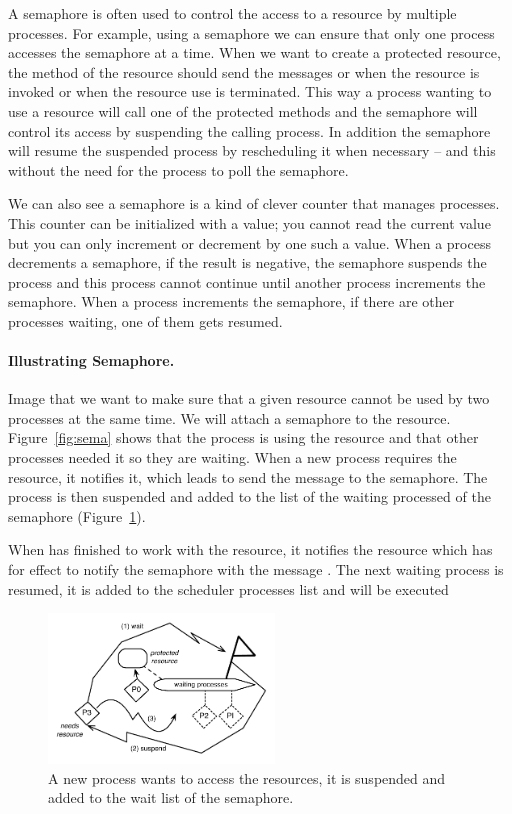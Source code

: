 \documentclass[a4paper,10pt,twoside]{book}
\begin{document}
A semaphore is often used to control the access  to a resource by multiple processes. For example, using a semaphore we can ensure that only one process accesses the semaphore at a time. 
When we want to create a protected resource, the method of the resource should send the messages  or  when the resource is invoked or  when the resource use is terminated. 
This way a process wanting to use a resource will call one of the protected methods and the semaphore
will control its access by suspending the calling process. In addition the semaphore will resume the suspended 
process by rescheduling it when necessary -- and this without the need for the process to poll the semaphore.


We can also see a semaphore is a kind of clever counter that manages processes. 
This counter can be initialized with a value;  you cannot read the current value but you can only increment or decrement by one such a value. When a process decrements a semaphore, if the result is negative, the 
semaphore suspends the process and this process cannot continue until another process increments 
the semaphore. When a process increments the semaphore, if there are other processes waiting, one of them gets resumed.



\paragraph{Illustrating Semaphore.}
Image that we want to make sure that a given resource cannot be used by two processes at the same time.
We will attach a semaphore to the resource. Figure~\ref{fig:sema} shows that the process  is using the resource and that other processes needed it so they are waiting. When a new process  requires the resource, it notifies it, which leads to send the message  to the semaphore. The process is then suspended and added to the list of the waiting processed of the semaphore (Figure~\ref{fig:SemaphoreSendingWait}). 


When  has finished to work with the resource, it notifies the resource which has for effect to notify the semaphore with the message . The next waiting process is resumed, it is added to the scheduler processes list and will be executed 


\begin{figure}
\begin{center}
\includegraphics[width=6cm]{SemaphoreSendingWait2}
\caption{A new process wants to access the resources, it is suspended and added to the wait list of the semaphore. \label{fig:SemaphoreSendingWait}}
\end{center}
\end{figure}
\end{document}
